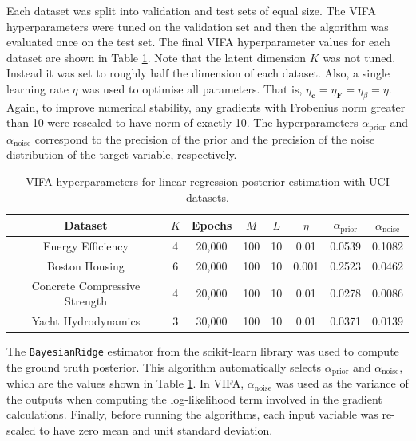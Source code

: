 \documentclass[msc,deptreport.inf]{infthesis} %
\newcommand{\matr}[1]{\mathbf{#1}}
\begin{document}
Each dataset was split into validation and test sets of equal size. The VIFA hyperparameters were tuned on the validation set and then the algorithm was evaluated once on the test set. The final VIFA hyperparameter values for each dataset are shown in Table \ref{table:vifa_uci_hyperparameters}. Note that the latent dimension $K$ was not tuned. Instead it was set to roughly half the dimension of each dataset. Also, a single learning rate $\eta$ was used to optimise all parameters. That is, $\eta_\matr{c} = \eta_\matr{F} = \eta_\beta = \eta$. Again, to improve numerical stability, any gradients with Frobenius norm greater than 10 were rescaled to have norm of exactly 10. The hyperparameters $\alpha_{\text{prior}}$ and $\alpha_{\text{noise}}$ correspond to the precision of the prior and the precision of the noise distribution of the target variable, respectively. 

\begin{table}[h!]
	\begin{center}
		\begin{tabular}{||c c c c c c c c||} 
			\hline
 			Dataset & $K$ & Epochs & $M$ & $L$ & $\eta$ & $\alpha_{\text{prior}}$ & $\alpha_{\text{noise}}$ \\ [0.5ex] 
			\hline\hline
			Energy Efficiency & 4 & 20,000 & 100 & 10 & 0.01 & 0.0539 & 0.1082 \\ 
 			\hline
			Boston Housing & 6 & 20,000 & 100 & 10 & 0.001 & 0.2523 & 0.0462 \\
 			\hline
 			Concrete Compressive Strength & 4 & 20,000 & 100 & 10 & 0.01 & 0.0278 & 0.0086 \\
 			\hline
 			Yacht Hydrodynamics & 3 & 30,000 & 100 & 10 & 0.01 & 0.0371 & 0.0139 \\ [1ex] 
 			\hline
		\end{tabular}
		\caption{VIFA hyperparameters for linear regression posterior estimation with UCI datasets.}
		\label{table:vifa_uci_hyperparameters}
	\end{center}
\end{table}

The \texttt{BayesianRidge} estimator from the scikit-learn library \cite{pedregosa2012} was used to compute the ground truth posterior. This algorithm automatically selects $\alpha_{\text{prior}}$ and $\alpha_{\text{noise}}$, which are the values shown in Table \ref{table:vifa_uci_hyperparameters}. In VIFA, $\alpha_{\text{noise}}$ was used as the variance of the outputs when computing the log-likelihood term involved in the gradient calculations. Finally, before running the algorithms, each input variable was re-scaled to have zero mean and unit standard deviation.  
\end{document}

